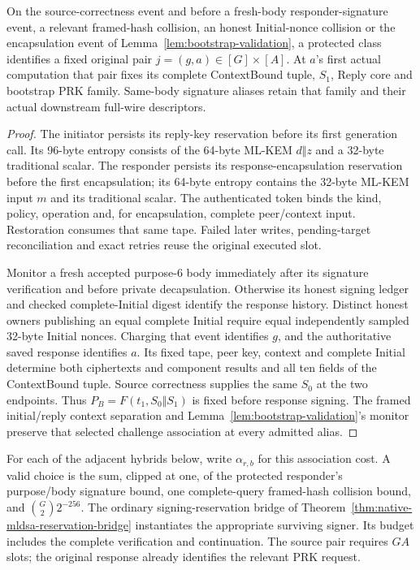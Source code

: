 \begin{lemma}
\label{lem:bootstrap-reply-origin}
On the source-correctness event and before a fresh-body responder-signature
event, a relevant framed-hash collision, an honest Initial-nonce collision
or the encapsulation event
of Lemma~\ref{lem:bootstrap-validation}, a protected class identifies a
fixed original pair $j=(g,a)\in[G]\times[A]$. At $a$'s first actual
computation that pair fixes its complete ContextBound tuple, $S_1$,
Reply core and bootstrap PRK family. Same-body signature aliases retain
that family and their actual downstream full-wire descriptors.
\end{lemma}
\begin{proof}
The initiator persists its reply-key reservation before its first
generation call. Its 96-byte entropy consists of the 64-byte ML-KEM
$d\Vert z$ and a 32-byte traditional scalar. The responder persists
its response-encapsulation reservation before the first encapsulation;
its 64-byte entropy contains the 32-byte ML-KEM input $m$ and its
traditional scalar. The authenticated token binds the kind, policy,
operation and, for encapsulation, complete peer/context input.
Restoration consumes that same tape. Failed later writes, pending-target
reconciliation and exact retries reuse the original executed slot.

Monitor a fresh accepted purpose-6 body immediately after its signature
verification and before private decapsulation. Otherwise its honest
signing ledger and checked complete-Initial digest identify the response
history. Distinct honest owners publishing an equal complete Initial
require equal independently sampled 32-byte Initial nonces. Charging
that event identifies $g$, and the authoritative saved response
identifies $a$. Its fixed tape, peer key, context and complete Initial
determine both ciphertexts and component results and all ten fields of
the ContextBound tuple. Source correctness supplies the same $S_0$ at
the two endpoints. Thus $P_B=F(t_1,S_0\Vert S_1)$ is fixed before
response signing. The framed initial/reply context separation and
Lemma~\ref{lem:bootstrap-validation}'s monitor preserve that selected
challenge association at every admitted alias.
\end{proof}

For each of the adjacent hybrids below, write $\alpha_{r,b}$ for this
association cost. A valid choice is the sum, clipped at one, of the
protected responder's purpose/body signature bound, one complete-query
framed-hash collision bound, and $\binom G2 2^{-256}$. The ordinary
signing-reservation bridge of
Theorem~\ref{thm:native-mldsa-reservation-bridge} instantiates the
appropriate surviving signer. Its budget includes the complete
verification and continuation. The source pair requires $GA$ slots;
the original response already identifies the relevant PRK request.


